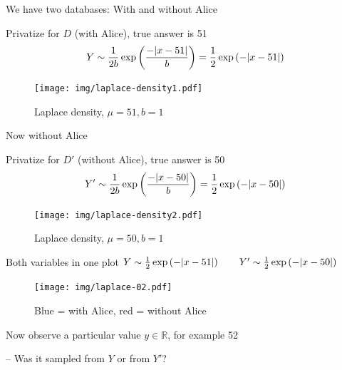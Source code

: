 \documentclass[12pt,aspectratio=169,handout]{beamer}
\begin{document}
\begin{frame}{We have two databases: With and without Alice}

Privatize for $D$ (with Alice), true answer is 51
$$
Y \sim \frac{1}{2b} \exp \left( \frac{-\abs{x - 51}}{b} \right) = \frac{1}{2} \exp \left( -\abs{x - 51} \right) 
$$

\begin{figure}
\centering
\texttt{[image: img/laplace-density1.pdf]}
\caption{Laplace density, $\mu = 51, b = 1$}
\end{figure}

\end{frame}



\begin{frame}{Now without Alice}


Privatize for $D'$ (without Alice), true answer is 50
$$
Y' \sim \frac{1}{2b} \exp \left( \frac{-\abs{x - 50}}{b} \right) = \frac{1}{2} \exp \left( -\abs{x - 50} \right) 
$$


\begin{figure}
\centering
\texttt{[image: img/laplace-density2.pdf]}
\caption{Laplace density, $\mu = 50, b = 1$}
\end{figure}

\end{frame}

\begin{frame}{Both variables in one plot}
$
Y \sim  \frac{1}{2} \exp \left( -\abs{x - 51} \right) \qquad
Y' \sim \frac{1}{2} \exp \left( -\abs{x - 50} \right) 
$

\begin{figure}
\centering
\texttt{[image: img/laplace-02.pdf]}
\caption{Blue = with Alice, red = without Alice}
\end{figure}

Now observe a particular value $y \in \mathbb{R}$, for example 52

-- Was it sampled from $Y$ or from $Y'$?

\end{frame}
\end{document}
